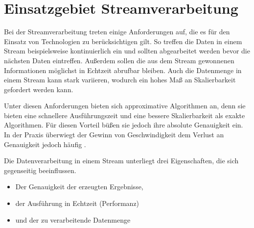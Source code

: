 \section{Einsatzgebiet Streamverarbeitung}
Bei der Streamverarbeitung treten einige Anforderungen auf, die es für den Einsatz von Technologien zu berücksichtigen gilt. 
So treffen die Daten in einem Stream beispielsweise kontinuierlich ein und sollten abgearbeitet werden bevor die nächsten Daten eintreffen. 
Außerdem sollen die aus dem Stream gewonnenen Informationen möglichst in Echtzeit abrufbar bleiben.
Auch die Datenmenge in einem Stream kann stark variieren, wodurch ein hohes Maß an Skalierbarkeit gefordert werden kann.

Unter diesen Anforderungen bieten sich approximative Algorithmen an, denn sie bieten eine schnellere Ausführungszeit und eine bessere Skalierbarkeit als exakte Algorithmen. 
Für diesen Vorteil büßen sie jedoch ihre absolute Genauigkeit ein. 
In der Praxis überwiegt der Gewinn von Geschwindigkeit dem Verlust an Genauigkeit jedoch häufig \cite{Maas2019}. 





Die Datenverarbeitung in einem Stream unterliegt drei Eigenschaften, die sich gegenseitig beeinflussen. \cite{Maas2019}

\begin{itemize}
\item
Der Genauigkeit der erzeugten Ergebnisse,
\item
der Ausführung in Echtzeit (Performanz)
\item
und der zu verarbeitende Datenmenge
\end{itemize}